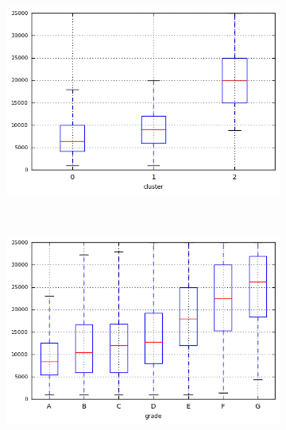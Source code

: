 \begin{anexosenv}
\begin{figure}[t!]
\begin{subfigure}[t]{0.45\textwidth}
        \end{subfigure}
        \\
                \caption{\emph{Boxplots} de funded\textunderscore amnt}
        \begin{subfigure}[t]{0.45\textwidth}
            \centering

            \centerline{\includegraphics[width=1.05\textwidth]{img/funded_amnt_by_cluster}}
        \end{subfigure}%
        ~ 
        \begin{subfigure}[t]{0.45\textwidth}
            \centering
   
            \centerline{\includegraphics[width=1.05\textwidth]{img/funded_amnt_by_grade}}

        \end{subfigure}


\end{figure}
\end{anexosenv}
